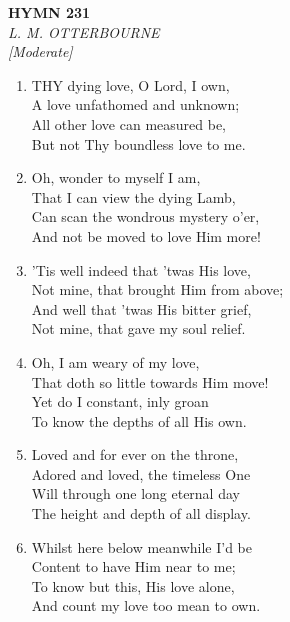 \newpage
\begin{center}
    {\Large \textbf{HYMN 231}}
    \\
    \textit{L. M. OTTERBOURNE}
    \\
    \textit{\small [Moderate]}
\end{center}
\vspace{1em}

\begin{enumerate}
    \item THY dying love, O Lord, I own, \\
        A love unfathomed and unknown; \\
        All other love can measured be, \\
        But not Thy boundless love to me.

    \item Oh, wonder to myself I am, \\
        That I can view the dying Lamb, \\
        Can scan the wondrous mystery o'er, \\
        And not be moved to love Him more!

    \item 'Tis well indeed that 'twas His love, \\
        Not mine, that brought Him from above; \\
        And well that 'twas His bitter grief, \\
        Not mine, that gave my soul relief.

    \item Oh, I am weary of my love, \\
        That doth so little towards Him move! \\
        Yet do I constant, inly groan \\
        To know the depths of all His own.

    \item Loved and for ever on the throne, \\
        Adored and loved, the timeless One \\
        Will through one long eternal day \\
        The height and depth of all display.

    \item Whilst here below meanwhile I'd be \\
        Content to have Him near to me; \\
        To know but this, His love alone, \\
        And count my love too mean to own.

\end{enumerate}

